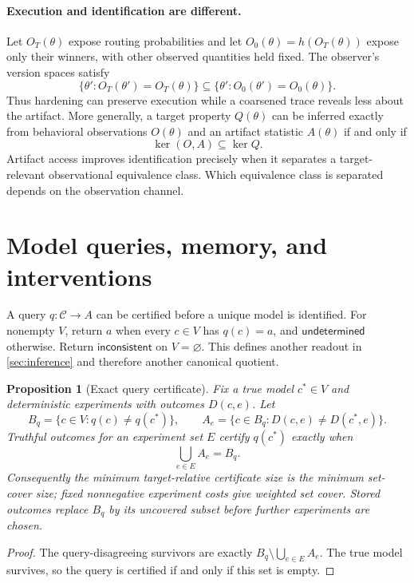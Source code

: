 \documentclass{article}
\newtheorem{proposition}[proposition]{Proposition}
\theoremstyle{definition}
\newcommand{\C}{\mathcal C}
\newcommand{\kerop}{\operatorname{ker}}
\newcommand{\bottomans}{\mathsf{inconsistent}}
\newcommand{\unknown}{\mathsf{undetermined}}
\begin{document}
\paragraph{Execution and identification are different.}
Let $O_T(\theta)$ expose routing probabilities and let $O_0(\theta)=h(O_T(\theta))$ expose only their winners, with other observed quantities held fixed. The observer's version spaces satisfy
\begin{equation}
 \{\theta':O_T(\theta')=O_T(\theta)\}
 \subseteq
 \{\theta':O_0(\theta')=O_0(\theta)\}.\label{eq:coarsen}
\end{equation}
Thus hardening can preserve execution while a coarsened trace reveals less about the artifact. More generally, a target property $Q(\theta)$ can be inferred exactly from behavioral observations $O(\theta)$ and an artifact statistic $A(\theta)$ if and only if
\begin{equation}
 \kerop(O,A)\subseteq\kerop Q.\label{eq:sufficiency}
\end{equation}
Artifact access improves identification precisely when it separates a target-relevant observational equivalence class. Which equivalence class is separated depends on the observation channel.

\section{Model queries, memory, and interventions}\label{sec:queries}
A query $q:\C\to A$ can be certified before a unique model is identified. For nonempty $V$, return $a$ when every $c\in V$ has $q(c)=a$, and $\unknown$ otherwise. Return $\bottomans$ on $V=\varnothing$. This defines another readout in \cref{sec:inference} and therefore another canonical quotient.

\begin{proposition}[Exact query certificate]\label{prop:cover}
Fix a true model $c^*\in V$ and deterministic experiments with outcomes $D(c,e)$. Let
\begin{equation}
 B_q=\{c\in V:q(c)\ne q(c^*)\},\qquad
 A_e=\{c\in B_q:D(c,e)\ne D(c^*,e)\}.
 \label{eq:kill}
\end{equation}
Truthful outcomes for an experiment set $E$ certify $q(c^*)$ exactly when
\begin{equation}
 \bigcup_{e\in E}A_e=B_q.\label{eq:cover}
\end{equation}
Consequently the minimum target-relative certificate size is the minimum set-cover size; fixed nonnegative experiment costs give weighted set cover. Stored outcomes replace $B_q$ by its uncovered subset before further experiments are chosen.
\end{proposition}
\begin{proof}
The query-disagreeing survivors are exactly $B_q\setminus\bigcup_{e\in E}A_e$. The true model survives, so the query is certified if and only if this set is empty.
\end{proof}
\end{document}

